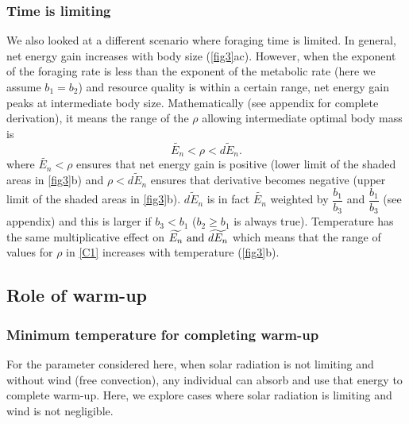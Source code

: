 \subsubsection*{Time is limiting}
We also looked at a different scenario where foraging time is limited.
In general, net energy gain increases with body size (\cref{fig3}ac).
However, when the exponent of the foraging rate is less than the exponent of the metabolic rate (here we assume $b_1 =b_2$) and resource quality is within a certain range,  net energy gain peaks at intermediate body size.
Mathematically (see appendix for complete derivation), it means the range of the $\rho$ allowing intermediate optimal body mass is 
\begin{equation}\label{C1}
	\widetilde{E_n} < \rho < \widetilde{dE_n}.
\end{equation}
where $\widetilde{E_n} < \rho $ ensures that net energy gain is positive (lower limit of the shaded areas in \cref{fig3}b) and $\rho < \widetilde{dE_n}$ ensures that derivative becomes negative (upper limit of the shaded areas in \cref{fig3}b). %
$\widetilde{dE_n}$ is in fact $\widetilde{E_n}$ weighted by $\dfrac{b_1}{b_3}$  and $\dfrac{b_1}{b_3}$ (see appendix) and this is larger if  $b_3 < b_1$ ($b_2 \geq b_1$ is always true). 
Temperature has the same multiplicative effect on $\widetilde{E_n}\textnormal{ and }\widetilde{dE_n}$ which means that the range of values for $\rho$ in \cref{C1} increases with temperature (\cref{fig3}b).
\subsection*{Role of warm-up}
\subsubsection*{Minimum temperature for completing warm-up}
For the parameter considered here, when solar radiation is not limiting and without wind (free convection), any individual can absorb and use that energy to complete warm-up.
Here, we explore cases where solar radiation is limiting and wind is not negligible.

